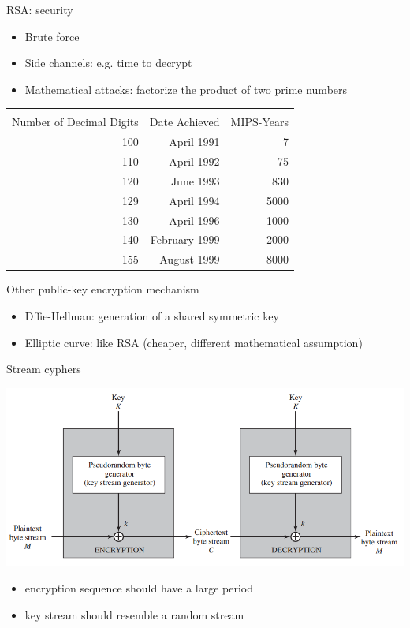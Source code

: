 \documentclass{beamer}
\begin{document}
\begin{frame}{RSA: security}
  \begin{itemize}
    \item Brute force 
    \item Side channels: e.g. time to decrypt
    \item Mathematical attacks: factorize the product of two prime numbers
  \end{itemize}
  \begin{center}
    \begin{tabular}{|r|r|r|}
      \hline\\
  Number of Decimal Digits &
  Date Achieved & MIPS-Years\\
  \hline
 100 & April 1991 & 7 \\ 
 110 & April 1992 & 75\\
 120 & June 1993 & 830\\
 129 & April 1994 & 5000\\
 130 & April 1996 & 1000\\
 140 & February 1999 & 2000\\
 155 & August 1999 & 8000\\
 \hline
 \end{tabular}
  \end{center}
\end{frame}


\begin{frame}{Other public-key encryption mechanism}
  \begin{itemize}
    \item Dffie-Hellman: generation of a shared symmetric key 
    \item Elliptic curve: like RSA (cheaper, different mathematical assumption)
  \end{itemize}
\end{frame}

\begin{frame}{Stream cyphers}
  \begin{center}
    \includegraphics[width=0.8\linewidth]{stream}
  \end{center}
  \begin{itemize}
    \item  encryption sequence should have a large period 
    \item  key stream should resemble a random stream
  \end{itemize}
\end{frame}
\end{document}
